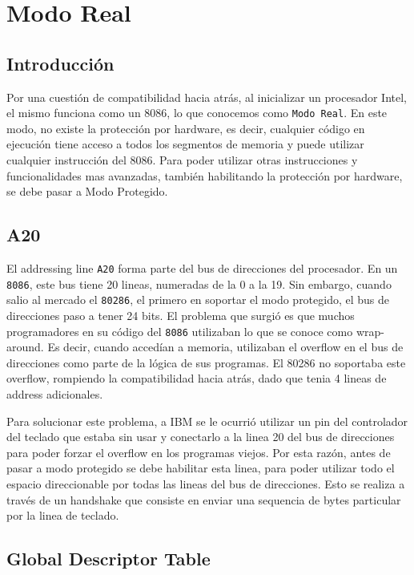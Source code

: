 \section{Modo Real}

\subsection{Introducción}

Por una cuestión de compatibilidad hacia atrás, al inicializar un procesador Intel, el mismo funciona como un 8086, lo que conocemos como \texttt{Modo Real}. En este modo, no existe la protección por hardware, es decir, cualquier código en ejecución tiene acceso a todos los segmentos de memoria y puede utilizar cualquier instrucción del 8086. Para poder utilizar otras instrucciones y funcionalidades mas avanzadas, también habilitando la protección por hardware, se debe pasar a Modo Protegido.

\subsection{A20}
El addressing line \texttt{A20} forma parte del bus de direcciones del procesador. En un \texttt{8086}, este bus tiene 20 lineas, numeradas de la 0 a la 19. Sin embargo, cuando salio al mercado el \texttt{80286}, el primero en soportar el modo protegido,  el bus de direcciones paso a tener 24 bits. El problema que surgió es que muchos programadores en su código del \texttt{8086} utilizaban lo que se conoce como wrap-around. Es decir, cuando accedían a memoria, utilizaban el overflow en el bus de direcciones como parte de la lógica de sus programas. El 80286 no soportaba este overflow, rompiendo la compatibilidad hacia atrás, dado que tenia 4 lineas de address adicionales.

Para solucionar este problema, a IBM se le ocurrió utilizar un pin del controlador del teclado que estaba sin usar y conectarlo a la linea 20 del bus de direcciones para poder forzar el overflow en los programas viejos. Por esta razón, antes de pasar a modo protegido se debe habilitar esta linea, para poder utilizar todo el espacio direccionable por todas las lineas del bus de direcciones. Esto se realiza a través de un handshake que consiste en enviar una sequencia de bytes particular por la linea de teclado.

\subsection{Global Descriptor Table}

